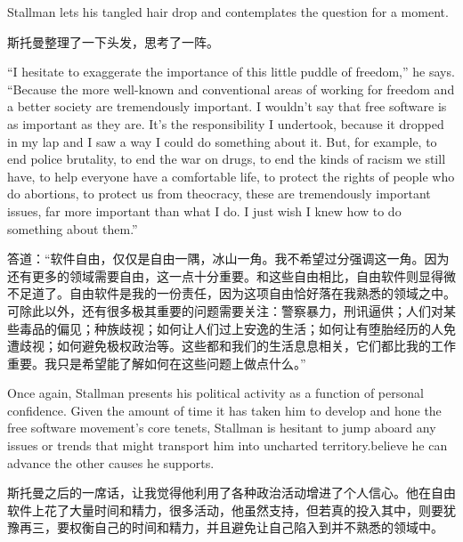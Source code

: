 \ifdefined\eng
Stallman lets his tangled hair drop and contemplates the question for a moment. \ifdefined{} \fi
\fi

\ifdefined\chs
斯托曼整理了一下头发，思考了一阵。 \ifdefined{} \fi
\fi

\ifdefined\eng
``I hesitate to exaggerate the importance of this little puddle of freedom,'' he says. ``Because the more well-known and conventional areas of working for freedom and a better society are tremendously important. I wouldn't say that free software is as important as they are. It's the responsibility I undertook, because it dropped in my lap and I saw a way I could do something about it. But, for example, to end police brutality, to end the war on drugs, to end the kinds of racism we still have, to help everyone have a comfortable life, to protect the rights of people who do abortions, to protect us from theocracy, these are tremendously important issues, far more important than what I do. I just wish I knew how to do something about them.''
\fi

\ifdefined\chs
答道：``软件自由，仅仅是自由一隅，冰山一角。我不希望过分强调这一角。因为还有更多的领域需要自由，这一点十分重要。和这些自由相比，自由软件则显得微不足道了。自由软件是我的一份责任，因为这项自由恰好落在我熟悉的领域之中。可除此以外，还有很多极其重要的问题需要关注：警察暴力，刑讯逼供；人们对某些毒品的偏见；种族歧视；如何让人们过上安逸的生活；如何让有堕胎经历的人免遭歧视；如何避免极权政治等。这些都和我们的生活息息相关，它们都比我的工作重要。我只是希望能了解如何在这些问题上做点什么。''
\fi

\ifdefined\eng
Once again, Stallman presents his political activity as a function of personal confidence. Given the amount of time it has taken him to develop and hone the free software movement's core tenets, Stallman is hesitant to \ifdefined\vone jump aboard any issues or trends that might transport him into uncharted territory.\fi\ifdefined\vtwo believe he can advance the other causes he supports.\fi
\fi

\ifdefined\chs
斯托曼之后的一席话，让我觉得他利用了各种政治活动增进了个人信心。他在自由软件上花了大量时间和精力，很多活动，他虽然支持，但若真的投入其中，则要犹豫再三，要权衡自己的时间和精力，并且避免让自己陷入到并不熟悉的领域中。
\fi

